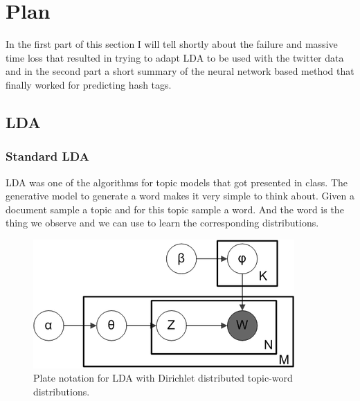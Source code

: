 \documentclass[10pt,conference,compsocconf]{IEEEtran}
\begin{document}
\section{Plan}
\label{sec:Plan}
In the first part of this section I will tell shortly about the failure and massive time loss that resulted in trying to adapt LDA to be used with the twitter data and in the second part a short summary of the neural network based method that finally worked for predicting hash tags. 
\subsection{LDA}
\subsubsection{Standard LDA}
LDA was one of the algorithms for topic models that got presented in class. The generative model to generate a word makes it very simple to think about. Given a document sample a topic and for this topic sample a word. And the word is the thing we observe and we can use to learn the corresponding distributions. 
\begin{figure}
	\centering
	\includegraphics[width=0.7\linewidth]{images/lda_plate}
	\caption{Plate notation for LDA with Dirichlet distributed topic-word distributions.}
	\label{fig:ldaplate}
\end{figure}
\end{document}
